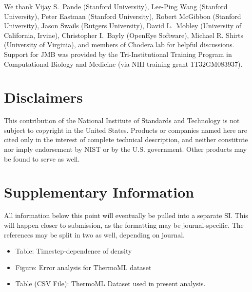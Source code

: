 \documentclass[aps,pre,twocolumn,nofootinbib,superscriptaddress,linenumbers]{revtex4-1}
\begin{document}
We thank Vijay S.~Pande (Stanford University), Lee-Ping Wang (Stanford University), Peter Eastman (Stanford University), Robert McGibbon (Stanford University), Jason Swails (Rutgers University), David L.~Mobley (University of California, Irvine), Christopher I.~Bayly (OpenEye Software), Michael R. Shirts (University of Virginia), and members of Chodera lab for helpful discussions.  
Support for JMB was provided by the Tri-Institutional Training Program in Computational Biology and Medicine (via NIH training grant 1T32GM083937).


\section{Disclaimers}

This contribution of the National Institute of Standards and Technology is not subject to copyright in the United States.  
Products or companies named here are cited only in the interest of complete technical description, and neither constitute nor imply endorsement by NIST or by the U.S. government.  Other products may be found to serve as well.

\clearpage

\appendix 

\section{Supplementary Information}

All information below this point will eventually be pulled into a separate SI.  
This will happen closer to submission, as the formatting may be journal-specific.  
The references may be split in two as well, depending on journal.

\begin{itemize}
 \item Table: Timestep-dependence of density
 \item Figure: Error analysis for ThermoML dataset
 \item Table (CSV File): ThermoML Dataset used in present analysis.
\end{itemize}
\end{document}
